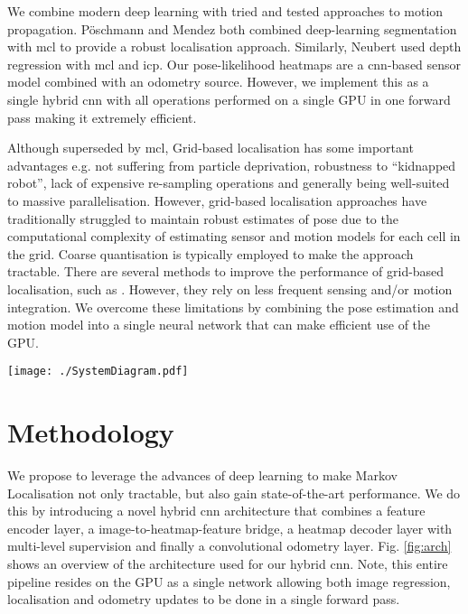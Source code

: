 \documentclass[letterpaper, 10 pt, conference]{ieeeconf}  %
\begin{document}
We combine modern deep learning with tried and tested approaches to motion propagation. P\"{o}schmann \etal \cite{Poschmann2017} and Mendez \etal \cite{Mendez18} both combined deep-learning segmentation with \ac{mcl} to provide a robust localisation approach.
Similarly, Neubert \etal \cite{Neubert2017} used depth regression with \ac{mcl} and \ac{icp}.
Our pose-likelihood heatmaps are a \ac{cnn}-based sensor model combined with an odometry source.
However, we implement this as a single hybrid \ac{cnn} with all operations performed on a single GPU in one forward pass making it extremely efficient. 

Although superseded by \ac{mcl}, Grid-based localisation has some important advantages e.g. not suffering from particle deprivation, robustness to ``kidnapped robot'', lack of expensive re-sampling operations and generally being well-suited to massive parallelisation.
However, grid-based localisation approaches have traditionally struggled to maintain robust estimates of pose due to the computational complexity of estimating sensor and motion models for each cell in the grid. Coarse quantisation is typically employed to make the approach tractable.
There are several methods to improve the performance of grid-based localisation, such as \cite{burgard1999experiences}.
However, they rely on less frequent sensing and/or motion integration.
We overcome these limitations by combining the pose estimation and motion model into a single neural network that can make efficient use of the GPU. 

\begin{figure*}[t]
    \centering
    \texttt{[image: ./SystemDiagram.pdf]}  
    \caption{Deep Markov Localisation: System Diagram.}
    \label{fig:arch}
    \vspace{-0.5cm}
\end{figure*}

\section{Methodology}
We propose to leverage the advances of deep learning to make Markov Localisation not only tractable, but also gain state-of-the-art performance.
We do this by introducing a novel hybrid \ac{cnn} architecture that combines a feature encoder layer, a image-to-heatmap-feature bridge, a heatmap decoder layer with multi-level supervision and finally a convolutional odometry layer.
Fig. \ref{fig:arch} shows an overview of the architecture used for our hybrid \ac{cnn}. Note, this entire pipeline resides on the GPU as a single network allowing both image regression, localisation and odometry updates to be done in a single forward pass. 
\end{document}
